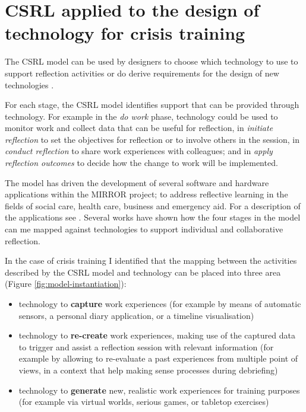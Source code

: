\section{CSRL applied to the design of technology for crisis
training}\label{csrl-applied-to-the-design-of-technology-for-crisis-training}

The CSRL model can be used by designers to choose which technology to
use to support reflection activities or do derive requirements for the
design of new technologies \autocite{Krogstie:2013kf}.

For each stage, the CSRL model identifies support that can be provided
through technology. For example in the \emph{do work} phase, technology
could be used to monitor work and collect data that can be useful for
reflection, in \emph{initiate reflection} to set the objectives for
reflection or to involve others in the session, in \emph{conduct
reflection} to share work experiences with colleagues; and in
\emph{apply reflection outcomes} to decide how the change to work will
be implemented.

The model has driven the development of several software and hardware
applications within the MIRROR project; to address reflective learning
in the fields of social care, health care, business and emergency aid.
For a description of the applications see \autocite{Schwantzer:2014we}.
Several works \autocites{Krogstie:2013kf}{Krogstie:fo}{Krogstie:2012ki}
have shown how the four stages in the model can me mapped against
technologies to support individual and collaborative reflection.

In the case of crisis training I identified that the mapping between the
activities described by the CSRL model and technology can be placed into
three area (Figure \ref{fig:model-instantiation}):

\begin{itemize}
\itemsep1pt\parskip0pt
\item
  technology to \textbf{capture} work experiences (for example by means
  of automatic sensors, a personal diary application, or a timeline
  visualisation)
\item
  technology to \textbf{re-create} work experiences, making use of the
  captured data to trigger and assist a reflection session with relevant
  information (for example by allowing to re-evaluate a past experiences
  from multiple point of views, in a context that help making sense
  processes during debriefing)
\item
  technology to \textbf{generate} new, realistic work experiences for
  training purposes (for example via virtual worlds, serious games, or
  tabletop exercises)
\end{itemize}

